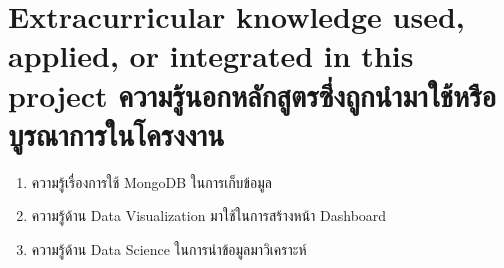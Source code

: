 \section{\ifenglish%
Extracurricular knowledge used, applied, or integrated in this project
\else%
ความรู้นอกหลักสูตรซึ่งถูกนำมาใช้หรือบูรณาการในโครงงาน
\fi
}
\begin{enumerate}
    \item ความรู้เรื่องการใช้ MongoDB ในการเก็บข้อมูล
    \item ความรู้ด้าน Data Visualization มาใช้ในการสร้างหน้า Dashboard
    \item ความรู้ด้าน Data Science ในการนำข้อมูลมาวิเคราะห์
\end{enumerate}

